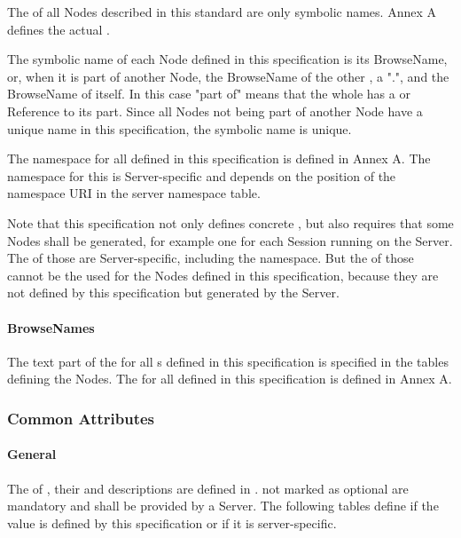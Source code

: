 The  of all \glspl{Node} described in this standard are only symbolic names. Annex A defines the actual .

The symbolic name of each \gls{Node} defined in this specification is its \gls{BrowseName}, or, when it is part of another Node, the \gls{BrowseName} of the other , a ".", and the \gls{BrowseName} of itself. In this case "part of" means that the whole has a  or  Reference to its part. Since all \glspl{Node} not being part of another \gls{Node} have a unique name in this specification, the symbolic name is unique.

The namespace for all  defined in this specification is defined in Annex A. The namespace for this  is Server-specific and depends on the position of the namespace URI in the server namespace table.

Note that this specification not only defines concrete , but also requires that some Nodes shall be generated, for example one for each Session running on the Server. The  of those  are Server-specific, including the namespace. But the  of those  cannot be the  used for the Nodes defined in this specification, because they are not defined by this specification but generated by the Server.

\paragraph{BrowseNames}
The text part of the  for all s defined in this specification is specified in the tables defining the Nodes. The  for all  defined in this specification is defined in Annex A.

\subsubsection{Common Attributes}

\paragraph{General}
The  of , their  and descriptions are defined in \cite{UAPart3}.  not marked as optional are mandatory and shall be provided by a Server. The following tables define if the  value is defined by this specification or if it is server-specific.

